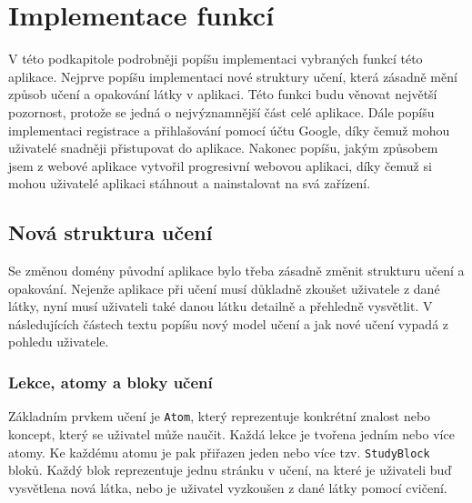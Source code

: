 
\section{Implementace funkcí}

V této podkapitole podrobněji popíšu implementaci vybraných funkcí této aplikace. Nejprve popíšu implementaci nové struktury učení, která zásadně mění způsob učení a opakování látky v aplikaci. Této funkci budu věnovat největší pozornost, protože se jedná o nejvýznamnější část celé aplikace. Dále popíšu implementaci registrace a přihlašování pomocí účtu Google, díky čemuž mohou uživatelé snadněji přistupovat do aplikace. Nakonec popíšu, jakým způsobem jsem z webové aplikace vytvořil progresivní webovou aplikaci, díky čemuž si mohou uživatelé aplikaci stáhnout a nainstalovat na svá zařízení.

\subsection{Nová struktura učení}

Se změnou domény původní aplikace bylo třeba zásadně změnit strukturu učení a opakování. Nejenže aplikace při učení musí důkladně zkoušet uživatele z dané látky, nyní musí uživateli také danou látku detailně a přehledně vysvětlit. V následujících částech textu popíšu nový model učení a jak nové učení vypadá z pohledu uživatele. 

\subsubsection{Lekce, atomy a bloky učení}

Základním prvkem učení je \texttt{Atom}, který reprezentuje konkrétní znalost nebo koncept, který se uživatel může naučit. Každá lekce je tvořena jedním nebo více atomy. Ke každému atomu je pak přiřazen jeden nebo více tzv. \texttt{StudyBlock} bloků. Každý blok reprezentuje jednu stránku v učení, na které je uživateli buď vysvětlena nová látka, nebo je uživatel vyzkoušen z dané látky pomocí cvičení. 

